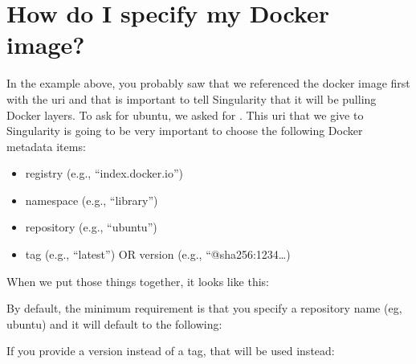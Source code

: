 \documentclass[letterpaper,10pt,english]{sphinxmanual}
\begin{document}
\section{How do I specify my Docker image?}
\label{\detokenize{singularity_and_docker:how-do-i-specify-my-docker-image}}
In the example above, you probably saw that we referenced the docker
image first with the uri  and that is important to tell Singularity that
it will be pulling Docker layers. To ask for ubuntu, we asked for  . This
uri that we give to Singularity is going to be very important to choose
the following Docker metadata items:
\begin{itemize}
\item {} 
registry (e.g., “index.docker.io”)

\item {} 
namespace (e.g., “library”)

\item {} 
repository (e.g., “ubuntu”)

\item {} 
tag (e.g., “latest”) OR version (e.g., “@sha256:1234…)

\end{itemize}

When we put those things together, it looks like this:

%
\begin{sphinxVerbatim}[commandchars=\\\{\}]
\end{sphinxVerbatim}

By default, the minimum requirement is that you specify a repository
name (eg, ubuntu) and it will default to the following:

%
\begin{sphinxVerbatim}[commandchars=\\\{\}]
\end{sphinxVerbatim}

If you provide a version instead of a tag, that will be used instead:
\end{document}
